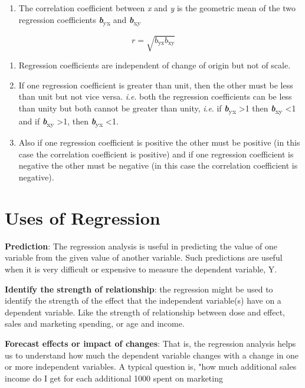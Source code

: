 \documentclass[
]{book}
\providecommand{\tightlist}{%
  \setlength{\itemsep}{0pt}\setlength{\parskip}{0pt}}
\begin{document}
\begin{enumerate}
\def\labelenumi{\arabic{enumi}.}
\tightlist
\item
  The correlation coefficient between \emph{x} and \emph{y} is the geometric
  mean of the two regression coefficients \textbf{\emph{b}}\textsubscript{yx} and \textbf{\emph{b}}\textsubscript{xy}
\end{enumerate}

\[r = \sqrt{b_{\text{yx}}b_{\text{xy}}}\]

\begin{enumerate}
\def\labelenumi{\arabic{enumi}.}
\setcounter{enumi}{1}
\item
  Regression coefficients are independent of change of origin but not
  of scale.
\item
  If one regression coefficient is greater than unit, then the other
  must be less than unit but not vice versa. \emph{i}.\emph{e}. both the
  regression coefficients can be less than unity but both cannot be
  greater than unity, \emph{i}.\emph{e}. if \textbf{\emph{b}}\textsubscript{yx} \textgreater1 then \textbf{\emph{b}}\textsubscript{xy} \textless1
  and if \textbf{\emph{b}}\textsubscript{xy} \textgreater1, then \textbf{\emph{b}}\textsubscript{yx} \textless1.
\item
  Also if one regression coefficient is positive the other must be
  positive (in this case the correlation coefficient is positive) and
  if one regression coefficient is negative the other must be negative
  (in this case the correlation coefficient is negative).
\end{enumerate}

\hypertarget{uses-of-regression}{%
\section{Uses of Regression}\label{uses-of-regression}}

\textbf{Prediction}: The regression analysis is useful in predicting the
value of one variable from the given value of another variable. Such
predictions are useful when it is very difficult or expensive to measure
the dependent variable, Y.

\textbf{Identify the strength of relationship}: the regression might be used
to identify the strength of the effect that the independent variable(s)
have on a dependent variable. Like the strength of relationship between
dose and effect, sales and marketing spending, or age and income.

\textbf{Forecast effects or impact of changes}: That is, the regression
analysis helps us to understand how much the dependent variable changes
with a change in one or more independent variables. A typical question
is, "how much additional sales income do I get for each additional 1000
spent on marketing
\end{document}
